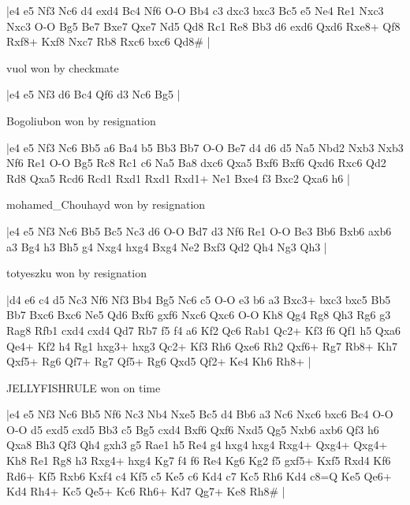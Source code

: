\makegametitle
|e4 e5 Nf3 Nc6 d4 exd4 Bc4 Nf6 O-O Bb4 c3 dxc3 bxc3 Bc5 e5 Ne4 Re1 Nxc3 Nxc3 O-O Bg5 Be7 Bxe7 Qxe7 Nd5 Qd8 Rc1 Re8 Bb3 d6 exd6 Qxd6 Rxe8+ Qf8 Rxf8+ Kxf8 Nxc7 Rb8 Rxc6 bxc6 Qd8\#  |

\showboard

vuol won by checkmate

\makegametitle
|e4 e5 Nf3 d6 Bc4 Qf6 d3 Nc6 Bg5  |

\showboard

Bogoliubon won by resignation

\makegametitle
|e4 e5 Nf3 Nc6 Bb5 a6 Ba4 b5 Bb3 Bb7 O-O Be7 d4 d6 d5 Na5 Nbd2 Nxb3 Nxb3 Nf6 Re1 O-O Bg5 Rc8 Rc1 c6 Na5 Ba8 dxc6 Qxa5 Bxf6 Bxf6 Qxd6 Rxc6 Qd2 Rd8 Qxa5 Rcd6 Rcd1 Rxd1 Rxd1 Rxd1+ Ne1 Bxe4 f3 Bxc2 Qxa6 h6  |

\showboard

mohamed\_Chouhayd won by resignation

\makegametitle
|e4 e5 Nf3 Nc6 Bb5 Bc5 Nc3 d6 O-O Bd7 d3 Nf6 Re1 O-O Be3 Bb6 Bxb6 axb6 a3 Bg4 h3 Bh5 g4 Nxg4 hxg4 Bxg4 Ne2 Bxf3 Qd2 Qh4 Ng3 Qh3  |

\showboard

totyeszku won by resignation

\makegametitle
|d4 e6 c4 d5 Nc3 Nf6 Nf3 Bb4 Bg5 Nc6 c5 O-O e3 b6 a3 Bxc3+ bxc3 bxc5 Bb5 Bb7 Bxc6 Bxc6 Ne5 Qd6 Bxf6 gxf6 Nxc6 Qxc6 O-O Kh8 Qg4 Rg8 Qh3 Rg6 g3 Rag8 Rfb1 cxd4 cxd4 Qd7 Rb7 f5 f4 a6 Kf2 Qc6 Rab1 Qc2+ Kf3 f6 Qf1 h5 Qxa6 Qe4+ Kf2 h4 Rg1 hxg3+ hxg3 Qc2+ Kf3 Rh6 Qxe6 Rh2 Qxf6+ Rg7 Rb8+ Kh7 Qxf5+ Rg6 Qf7+ Rg7 Qf5+ Rg6 Qxd5 Qf2+ Ke4 Kh6 Rh8+  |

\showboard

JELLYFISHRULE won on time

\makegametitle
|e4 e5 Nf3 Nc6 Bb5 Nf6 Nc3 Nb4 Nxe5 Bc5 d4 Bb6 a3 Nc6 Nxc6 bxc6 Bc4 O-O O-O d5 exd5 cxd5 Bb3 c5 Bg5 cxd4 Bxf6 Qxf6 Nxd5 Qg5 Nxb6 axb6 Qf3 h6 Qxa8 Bh3 Qf3 Qh4 gxh3 g5 Rae1 h5 Re4 g4 hxg4 hxg4 Rxg4+ Qxg4+ Qxg4+ Kh8 Re1 Rg8 h3 Rxg4+ hxg4 Kg7 f4 f6 Re4 Kg6 Kg2 f5 gxf5+ Kxf5 Rxd4 Kf6 Rd6+ Kf5 Rxb6 Kxf4 c4 Kf5 c5 Ke5 c6 Kd4 c7 Kc5 Rh6 Kd4 c8=Q Ke5 Qe6+ Kd4 Rh4+ Kc5 Qe5+ Kc6 Rh6+ Kd7 Qg7+ Ke8 Rh8\#  |

